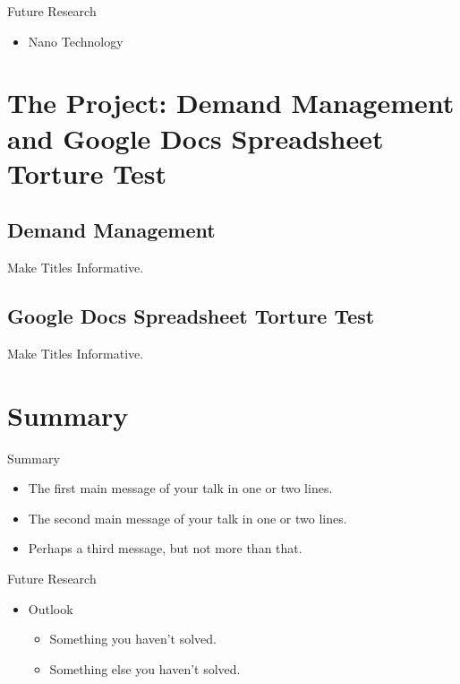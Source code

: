 \documentclass{beamer}
\begin{document}
\begin{frame}{Future Research}
  \begin{itemize}
  \item Nano Technology
  \end{itemize}
\end{frame}

\section[Research Project]{The Project: Demand Management and Google Docs Spreadsheet Torture Test}

\subsection{Demand Management}

\begin{frame}{Make Titles Informative.}
\end{frame}

\subsection[GDocs Spreadsheet Testing]{Google Docs Spreadsheet Torture Test}

\begin{frame}{Make Titles Informative.}
\end{frame}

\section*{Summary}

\begin{frame}{Summary}

\begin{itemize}
  \item The \alert{first main message} of your talk in one or two lines.
  \item The \alert{second main message} of your talk in one or two lines.
  \item Perhaps a \alert{third message}, but not more than that.
\end{itemize}

\end{frame}

\begin{frame}{Future Research}
\begin{itemize}
  \item Outlook
  \begin{itemize}
    \item Something you haven't solved.
    \item Something else you haven't solved.
  \end{itemize}
  \end{itemize}
\end{frame}
\end{document}
